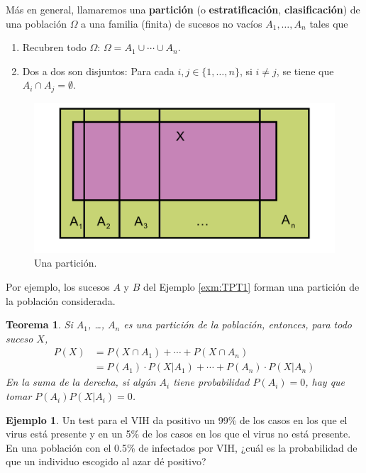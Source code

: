 \documentclass[
]{book}
\providecommand{\tightlist}{%
  \setlength{\itemsep}{0pt}\setlength{\parskip}{0pt}}
\newtheorem{theorem}{Teorema}[chapter]
\theoremstyle{definition}
\theoremstyle{definition}
\newtheorem{example}{Ejemplo}[chapter]
\theoremstyle{definition}
\theoremstyle{definition}
\theoremstyle{remark}
\begin{document}
Más en general, llamaremos una \textbf{partición} (o \textbf{estratificación}, \textbf{clasificación}) de una población \(\Omega\) a una familia (finita) de sucesos no vacíos \(A_1,\ldots,A_n\) tales que

\begin{enumerate}
\def\labelenumi{\arabic{enumi}.}
\tightlist
\item
  Recubren todo \(\Omega\): \(\Omega=A_1\cup\cdots\cup A_n\).
\item
  Dos a dos son disjuntos: Para cada \(i,j\in\{1,\ldots,n\}\), si \(i\neq j\), se tiene que \(A_i\cap A_j=\emptyset\).
\end{enumerate}

\begin{figure}

{\centering \includegraphics[width=0.8\linewidth]{INREMDN_files/figure-html/particio} 

}

\caption{Una partición.}\label{fig:partición}
\end{figure}

Por ejemplo, los sucesos \(A\) y \(B\) del Ejemplo \ref{exm:TPT1} forman una partición de la población considerada.

\begin{theorem}
\protect\hypertarget{thm:unnamed-chunk-137}{}\label{thm:unnamed-chunk-137}Si \(A_1\), \ldots, \(A_n\) es una partición de la población, entonces, para todo suceso \(X\),
\[
  \begin{array}{rl}
P(X)\!\!\!\! & = P(X\cap A_1) +\cdots+P(X\cap A_n)\\ & =P(A_1)\cdot P(X|A_1)+\cdots+ P(A_n)\cdot P(X|A_n)
\end{array}
\]
En la suma de la derecha, si algún \(A_i\) tiene probabilidad \(P(A_i)=0\), hay que tomar \(P(A_i)P(X|A_i)=0\).
\end{theorem}

\begin{example}
\protect\hypertarget{exm:VIH995prev}{}\label{exm:VIH995prev}Un test para el VIH da positivo un 99\% de los casos en los que el virus está presente y en un 5\% de los casos en los que el virus no está presente. En una población con el 0.5\% de infectados por VIH, ¿cuál es la probabilidad de que un individuo escogido al azar dé positivo?
\end{example}
\end{document}
